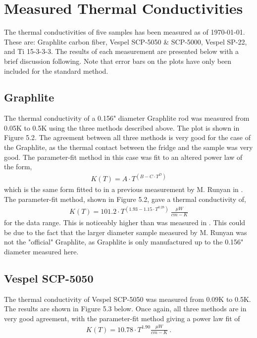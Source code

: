 \documentclass{report}
\begin{document}
\section{Measured Thermal Conductivities}
The thermal conductivities of five samples has been measured as of \today. These are: Graphlite carbon fiber, Vespel SCP-5050 \& SCP-5000, Vespel SP-22, and Ti 15-3-3-3. The results of each measurement are presented below with a brief discussion following. Note that error bars on the plots have only been included for the standard method.

\subsection{Graphlite}

The thermal conductivity of a 0.156" diameter Graphlite rod was measured from 0.05K to 0.5K using the three methods described above. The plot is shown in Figure 5.2. The agreement between all three methods is very good for the case of the Graphlite, as the thermal contact between the fridge and the sample was very good. The parameter-fit method in this case was fit to an altered power law of the form,
\begin{eqnarray}
K(T) = A \cdot T^{(B - C \cdot T^{D})}
\end{eqnarray}
which is the same form fitted to in a previous measurement by M. Runyan in \cite{run}. The parameter-fit method, shown in Figure 5.2, gave a thermal conductivity of,
\begin{eqnarray}
K(T) = 101.2 \cdot T^{(1.93 - 1.15 \cdot T^{0.28})} \ \frac{\mu W}{cm-K}
\end{eqnarray}
for the data range. This is noticeably higher than was measured in \cite{run}. This could be due to the fact that the larger diameter sample measured by M. Runyan was not the "official" Graphlite, as Graphlite is only manufactured up to the 0.156" diameter measured here.

\subsection{Vespel SCP-5050}

The thermal conductivity of Vespel SCP-5050 was measured from 0.09K to 0.5K. The results are shown in Figure 5.3 below. Once again, all three methods are in very good agreement, with the parameter-fit method giving a power law fit of
\begin{eqnarray}
K(T) = 10.78 \cdot T^{1.90} \frac{\mu W}{cm-K} \ .
\end{eqnarray}
\end{document}
